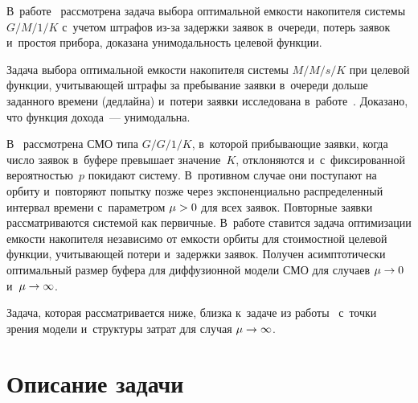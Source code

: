 \begin{multicols}{2}
В~работе~\cite{7-aga} рассмотрена 
задача выбора оптимальной емкости накопителя системы $G/M/1/K$ с~учетом 
штрафов из-за задержки заявок в~очереди, потерь заявок и~простоя прибора, 
доказана унимодальность целевой функции. 

Задача выбора оптимальной 
емкости накопителя системы $M/M/s/K$ при целевой функции, учитывающей 
штрафы за пребывание заявки в~очереди дольше заданного времени (дедлайна) 
и~потери заявки исследована в~работе~\cite{8-aga}. 
Доказано, что функция 
дохода~--- унимодальна. 

В~\cite{9-aga} рас\-смот\-ре\-на СМО типа $G/G/1/K$, 
в~которой при\-бы\-ва\-ющие заявки, когда число заявок в~буфере превышает 
значение~$K$, отклоняются и~с~фиксированной вероятностью~$p$ покидают 
сис\-те\-му. В~противном случае они поступают на орбиту и~повторяют попытку 
позже через экспоненциально распределенный интервал времени с~па\-ра\-мет\-ром 
$\mu\hm> 0$ для всех заявок. Повторные заявки рассматриваются сис\-те\-мой как 
первичные. В~работе ставится задача оптимизации емкости накопителя 
независимо от ем\-кости орбиты для стоимостной целевой функции, 
учи\-ты\-ва\-ющей потери и~за\-держ\-ки заявок. Получен асимптотически 
оптимальный размер буфера для диффузионной модели СМО для случаев 
$\mu\hm\to 0$ и~$\mu\hm\to\infty$.
  
  Задача, которая рассматривается ниже, близка к~задаче из работы~\cite{9-aga} 
с~точки зрения модели и~структуры затрат для случая $\mu\hm\to\infty$.
  
  \section{Описание задачи}
  

\end{multicols}
